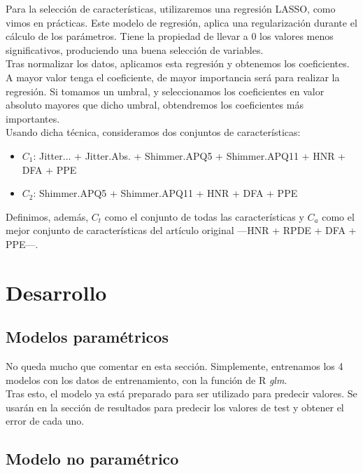 Para la selección de características, utilizaremos una regresión LASSO, como vimos en prácticas. Este modelo de regresión, aplica una regularización durante el cálculo de los parámetros. Tiene la propiedad de llevar a 0 los valores menos significativos, produciendo una buena selección de variables.\\

Tras normalizar los datos, aplicamos esta regresión y obtenemos los coeficientes. A mayor valor tenga el coeficiente, de mayor importancia será para realizar la regresión. Si tomamos un umbral, y seleccionamos los coeficientes en valor absoluto mayores que dicho umbral, obtendremos los coeficientes más importantes.\\

Usando dicha técnica, consideramos dos conjuntos de características:
\begin{itemize}
\item $C_1$: Jitter... + Jitter.Abs. + Shimmer.APQ5 + Shimmer.APQ11  + HNR + DFA + PPE
\item $C_2$: Shimmer.APQ5 + Shimmer.APQ11 + HNR + DFA + PPE
\end{itemize}

Definimos, además, $C_t$ como el conjunto de todas las características y $C_a$ como el mejor conjunto de características del artículo original ---HNR + RPDE + DFA + PPE---. \\

\newpage

\section{Desarrollo}

\subsection{Modelos paramétricos}

No queda mucho que comentar en esta sección. Simplemente, entrenamos los 4 modelos con los datos de entrenamiento, con la función de R \textit{glm}. \\

Tras esto, el modelo ya está preparado para ser utilizado para predecir valores. Se usarán en la sección de resultados para predecir los valores de test y obtener el error de cada uno.\\

\subsection{Modelo no paramétrico}

